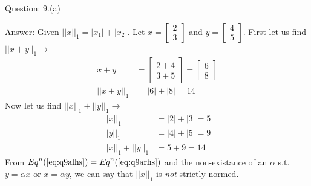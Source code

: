 \documentclass[a4paper]{article}
\begin{document}
\begin{qalist}
		
		\item[Question: 9.(a)] \setcounter{equation}{0}
		\item[Answer:] 	Given ${||x||}_{1} = |{x}_{1}| +|{x}_{2}|$. Let $x = \begin{bmatrix}2 \\ 3\end{bmatrix}$ and $y=\begin{bmatrix}4 \\ 5\end{bmatrix}$.
			First let us find ${||x+y||}_{1} \rightarrow$
			\begin{align}
				x+y &= \begin{bmatrix}2+4 \\ 3+5\end{bmatrix} = \begin{bmatrix}6 \\ 8\end{bmatrix} \\
				{||x+y||}_{1} &= |6| + |8| = 14 \label{eq:q9alhs}
			\end{align}
			Now let us find ${||x||}_{1} + {||y||}_{1} \rightarrow$
			\begin{align}
				{||x||}_{1} &= |2| + |3| = 5 \\
				{||y||}_{1} &= |4| + |5| = 9\\
				{||x||}_{1} + {||y||}_{1} &= 5 + 9 = 14 \label{eq:q9arhs}
			\end{align}
			From ${Eq}^{n}(\ref{eq:q9alhs}) = {Eq}^{n}(\ref{eq:q9arhs})$ and the non-existance of an $\alpha$ s.t. $y=\alpha x$ or $x = \alpha y $, we can say that ${||x||}_{1}$ is \underline{\emph{not} strictly normed}.
			

\end{qalist}
\end{document}
